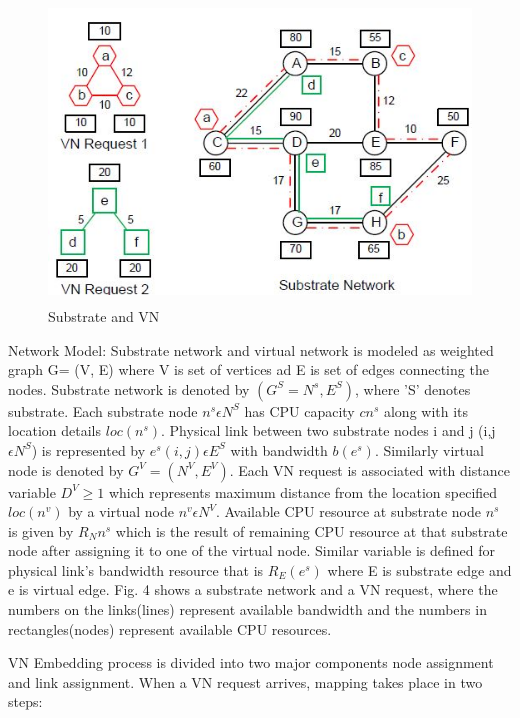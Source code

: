 \documentclass[article,dr=phil,type=msc ,colorback,accentcolor=tud4b]{tudthesis}
\begin{document}
\begin{figure}[h]
	\centering
	\includegraphics[width=14cm, height=8cm]{coord_map.jpg}
	\caption{Substrate and VN}
	\label{fig: substrate and VN}
\end{figure}


Network Model: 
Substrate network and virtual network is modeled as weighted graph G= (V, E) where V is set of vertices ad E is set of edges connecting the nodes. Substrate network is denoted by $(G^{S}= N^{s}, E^{S})$, where 'S' denotes substrate. Each substrate node $n^{s} \epsilon N^{S}$ has CPU capacity $c{n^{s}}$ along with its location details $loc(n^{s})$. Physical link between two substrate nodes i and j (i,j $\epsilon N^{S}$) is represented by $e^{s}(i, j) \epsilon E^{S}$ with bandwidth $b(e^{s})$. Similarly virtual node is denoted by $G^{V} = (N^{V}, E^{V})$. Each VN request is associated with distance variable $D^{V} \ge 1$ which represents maximum distance from the location specified $loc(n^{v})$ by a virtual node $n^{v} \epsilon N^{V}$. Available CPU resource at substrate node $n^{s}$ is given by $R_{N} n^{s}$ which is the result of remaining CPU resource at that substrate node after assigning it to one of the virtual node. Similar variable is defined for physical link's bandwidth resource that is $R_{E}(e^{s})$ where E is substrate edge and e is virtual edge. Fig. 4 shows a substrate network and a VN request, where the numbers on the links(lines) represent available bandwidth and the numbers in rectangles(nodes) represent available CPU resources.\newline

VN Embedding process is divided into two major components node assignment and link assignment. When a VN request arrives, mapping takes place in two steps: \newline
\end{document}
